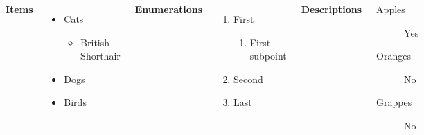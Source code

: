 \documentclass[
14pt,notheorems,hyperref={pdfauthor=whatever}
]{beamer}
\begin{document}
\begin{frame}
    \begin{columns}[T,onlytextwidth]
      \textbf{Items}
      \begin{itemize}
        \item Cats 
        \begin{itemize}
            \item British Shorthair
        \end{itemize}
        \item Dogs \item Birds \cite{peng2024aa}
      \end{itemize}

      \textbf{Enumerations}
      \begin{enumerate}
        \item First 
        \begin{enumerate}
            \item First subpoint
        \end{enumerate}
        \item Second \item Last
      \end{enumerate}

      \textbf{Descriptions}
      \begin{description}
        \item[Apples] Yes \item[Oranges] No \item[Grappes] No
      \end{description}
\end{columns}
\end{frame}
\end{document}
